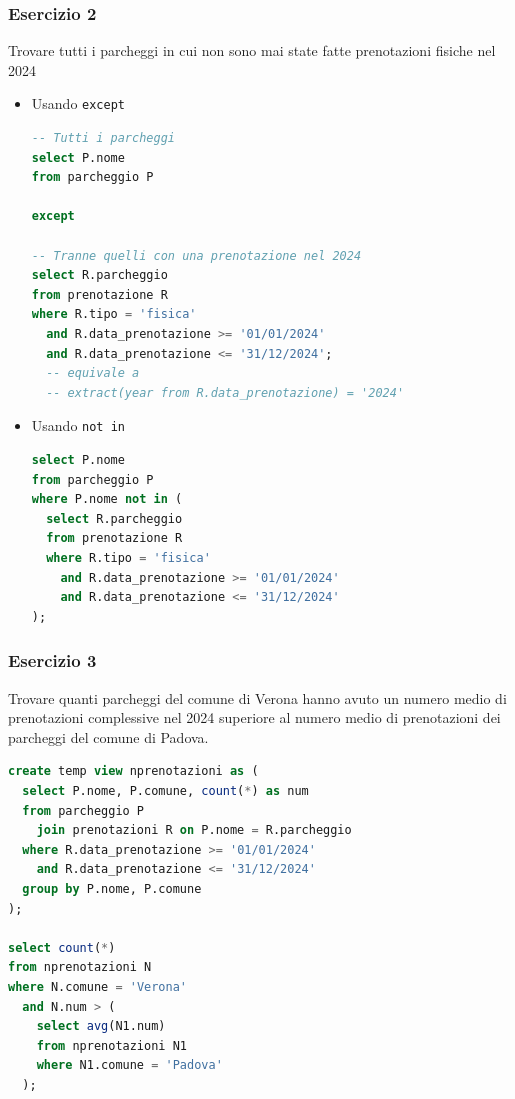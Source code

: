 \documentclass[a4paper,twoside]{article}
\begin{document}
\subsubsection{Esercizio 2}
Trovare tutti i parcheggi in cui non sono mai state fatte prenotazioni 
fisiche nel 2024
\begin{itemize}
  \item Usando \texttt{except}
\begin{lstlisting}[language=SQL]
-- Tutti i parcheggi
select P.nome
from parcheggio P

except

-- Tranne quelli con una prenotazione nel 2024
select R.parcheggio
from prenotazione R
where R.tipo = 'fisica'
  and R.data_prenotazione >= '01/01/2024'
  and R.data_prenotazione <= '31/12/2024';
  -- equivale a
  -- extract(year from R.data_prenotazione) = '2024'
\end{lstlisting}

  \item Usando \texttt{not in}
\begin{lstlisting}[language=SQL]
select P.nome
from parcheggio P
where P.nome not in (
  select R.parcheggio
  from prenotazione R
  where R.tipo = 'fisica'
    and R.data_prenotazione >= '01/01/2024'
    and R.data_prenotazione <= '31/12/2024'
);
\end{lstlisting}
\end{itemize}


\subsubsection{Esercizio 3}
Trovare quanti parcheggi del comune di Verona hanno avuto un numero medio di
prenotazioni complessive nel 2024 superiore al numero medio di prenotazioni dei
parcheggi del comune di Padova.

\begin{lstlisting}[language=SQL]
create temp view nprenotazioni as (
  select P.nome, P.comune, count(*) as num
  from parcheggio P
    join prenotazioni R on P.nome = R.parcheggio
  where R.data_prenotazione >= '01/01/2024'
    and R.data_prenotazione <= '31/12/2024'
  group by P.nome, P.comune
);

select count(*)
from nprenotazioni N
where N.comune = 'Verona'
  and N.num > (
    select avg(N1.num)
    from nprenotazioni N1
    where N1.comune = 'Padova'
  );
\end{lstlisting}
\end{document}

